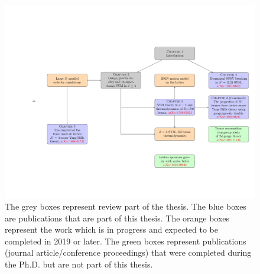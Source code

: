 \newpage 
\begin{figure}[tbp]
  \centering
  \includegraphics[width=\linewidth]{Figures/Flowchart.pdf}
  \caption{\label{fig:flow1}The grey boxes represent review part of the thesis. The blue boxes are publications that are part of this thesis. The orange boxes represent the work 
which is in progress and expected to be completed in 2019 or later. The green boxes represent publications (journal article/conference proceedings) that were completed 
during the Ph.D. but are not part of this thesis. }
\end{figure}



